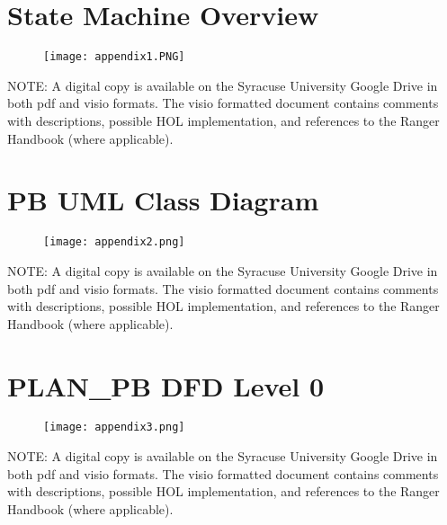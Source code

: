 \begin{landscape}
\chapter{State Machine Overview}
\label{cha:state-mach-overv}

\begin{figure}[h]
  \centering
  \texttt{[image: appendix1.PNG]}
\end{figure}
NOTE: A digital copy is available on the Syracuse University Google\textregistered
Drive in both pdf and visio formats. The visio formatted document contains
comments with descriptions, possible HOL implementation, and references
to the Ranger Handbook (where applicable).

\chapter{PB UML Class Diagram}
\label{cha:pb-uml-class}

\begin{figure}[h]
  \centering
  \texttt{[image: appendix2.png]}
\end{figure}
NOTE: A digital copy is available on the Syracuse University Google\textregistered
Drive in both pdf and visio formats. The visio formatted document contains
comments with descriptions, possible HOL implementation, and references
to the Ranger Handbook (where applicable).



\chapter{PLAN_PB DFD Level 0}
\label{cha:planpb-dfd-level-2}

\begin{figure}[h]
  \centering
  \texttt{[image: appendix3.png]}
\end{figure}
NOTE: A digital copy is available on the Syracuse University Google\textregistered
Drive in both pdf and visio formats. The visio formatted document contains
comments with descriptions, possible HOL implementation, and references
to the Ranger Handbook (where applicable).
\end{landscape}


